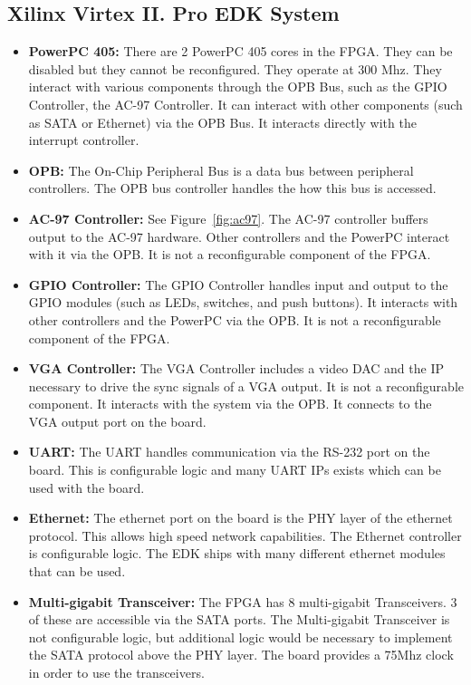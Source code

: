 \documentclass[11pt,letter,oneside]{report}
\begin{document}
\subsection{Xilinx Virtex II. Pro EDK System}
	\begin{itemize}
		\item \textbf{PowerPC 405:}
			There are 2 PowerPC 405 cores in the FPGA.  They can be disabled but they cannot be reconfigured.  They operate at 300 Mhz.  They interact with various components through the OPB Bus, such as the GPIO Controller, the AC-97 Controller.  It can interact with other components (such as SATA or Ethernet) via the OPB Bus.  It interacts directly with the interrupt controller.
		\item \textbf{OPB:}
			The On-Chip Peripheral Bus is a data bus between peripheral controllers.  The OPB bus controller handles the how this bus is accessed.
		\item \textbf{AC-97 Controller:}
			See Figure~\ref{fig:ac97}.  The AC-97 controller buffers output to the AC-97 hardware.  Other controllers and the PowerPC interact with it via the OPB.  It is not a reconfigurable component of the FPGA.
		\item \textbf{GPIO Controller:}
			The GPIO Controller handles input and output to the GPIO modules (such as LEDs, switches, and push buttons).  It interacts with other controllers and the PowerPC via the OPB.  It is not a reconfigurable component of the FPGA.
		\item \textbf{VGA Controller:}
			The VGA Controller includes a video DAC and the IP necessary to drive the sync signals of a VGA output.  It is not a reconfigurable component.  It interacts with the system via the OPB.  It connects to the VGA output port on the board.
		\item \textbf{UART:}
			The UART handles communication via the RS-232 port on the board.  This is configurable logic and many UART IPs exists which can be used with the board.
		\item \textbf{Ethernet:}
			The ethernet port on the board is the PHY layer of the ethernet protocol. This allows high speed network capabilities. The Ethernet controller is configurable logic.  The EDK ships with many different ethernet modules that can be used.
		\item \textbf{Multi-gigabit Transceiver:}
			The FPGA has 8 multi-gigabit Transceivers.  3 of these are accessible via the SATA ports.  The Multi-gigabit Transceiver is not configurable logic, but additional logic would be necessary to implement the SATA protocol above the PHY layer.  The board provides a 75Mhz clock in order to use the transceivers.

\end{itemize}
\end{document}
